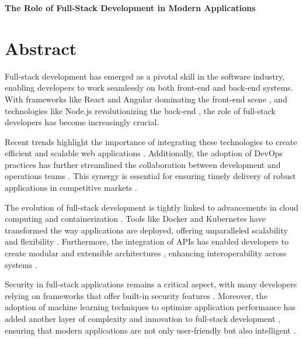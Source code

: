 \documentclass{article}
\begin{document}
	\begin{center}
		\Large\textbf{The Role of Full-Stack Development in Modern Applications}
	\end{center}
	
	\section{Abstract}
	Full-stack development has emerged as a pivotal skill in the software industry, enabling developers to work seamlessly on both front-end and back-end systems. With frameworks like React and Angular dominating the front-end scene \cite{smith2020react}, and technologies like Node.js revolutionizing the back-end \cite{johnson2019node}, the role of full-stack developers has become increasingly crucial.
	
	Recent trends highlight the importance of integrating these technologies to create efficient and scalable web applications \cite{lee2021scalable}. Additionally, the adoption of DevOps practices has further streamlined the collaboration between development and operations teams \cite{brown2018devops}. This synergy is essential for ensuring timely delivery of robust applications in competitive markets \cite{williams2020delivery}.
	
	
	The evolution of full-stack development is tightly linked to advancements in cloud computing and containerization \cite{davis2017cloud}. Tools like Docker and Kubernetes have transformed the way applications are deployed, offering unparalleled scalability and flexibility \cite{white2021docker}. Furthermore, the integration of APIs has enabled developers to create modular and extensible architectures \cite{green2019api}, enhancing interoperability across systems \cite{garcia2022interop}.
	
	Security in full-stack applications remains a critical aspect, with many developers relying on frameworks that offer built-in security features \cite{roberts2023security}. Moreover, the adoption of machine learning techniques to optimize application performance has added another layer of complexity and innovation to full-stack development \cite{miller2020ml}, ensuring that modern applications are not only user-friendly but also intelligent \cite{clark2018ai}.
	


	
\end{document}
